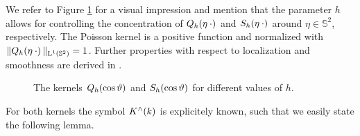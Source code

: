 \documentclass[11pt,a4paper,twoside,bibtotoc]{scrartcl}
\theoremstyle{plain}
\theoremstyle{definition}
\theoremstyle{remark}
\newcommand{\twosphere}{\ensuremath{\mathbb{S}^2}}
\newcommand{\Ln}[2]{\ensuremath{\text{\rm{L}}^{#1}\left(#2\right)}}
\newcommand{\fun}[2]{\ensuremath{#1{\hspace{-0.4ex}}\left(#2\right)}}
\newcommand{\mb}[1]{\mathbf{#1}}
\newcommand{\V}[1]{\mb{#1}}
\numberwithin{equation}{section}
\numberwithin{table}{section}
\numberwithin{figure}{section}
\begin{document}
We refer to Figure \ref{Basics:Figure:PoissonSingularityKernel} for a visual
impression and mention that the parameter $h$ allows for controlling the
concentration of $\fun{Q_{h}}{\V{\eta} \: \cdot}$ and $\fun{S_{h}}{\V{\eta} \:
  \cdot}$ around $\eta \in \twosphere$, respectively.
The Poisson kernel is a positive function and normalized with
$\|\fun{Q_{h}}{\V{\eta} \: \cdot}\|_{\Ln{1}{\twosphere}}=1$.
Further properties with respect to localization and smoothness are derived
in \cite[pp. 112]{frgesc}.

\begin{figure}[tb]
  \centering
  \hfill
  \caption{The kernels $\fun{Q_{h}}{\cos\vartheta}$ and $\fun{S_{h}}{\cos\vartheta}$
  for different values of $h$.}
  \label{Basics:Figure:PoissonSingularityKernel}
\end{figure}

For both kernels the symbol $\fun{K^{\wedge}}{k}$ is explicitely
known, such that we easily state 
the following lemma.
\end{document}
